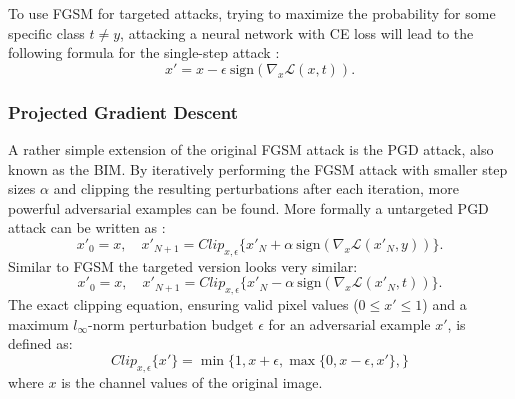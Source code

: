 To use \ac{FGSM} for targeted attacks, trying to maximize the probability for some specific class $t \ne y$, attacking a neural network with \ac{CE} loss will lead to the following formula for the single-step attack \cite{kurakin2016scale}:
\begin{equation}
x' = x - \epsilon\ \text{sign}(\nabla_x\mathcal{L}(x, t)).
\label{eq:fgsm-targeted}
\end{equation}

\subsubsection{Projected Gradient Descent}
A rather simple extension of the original \ac{FGSM} attack is the \ac{PGD} attack, also known as the \ac{BIM}. By iteratively performing the \ac{FGSM} attack with smaller step sizes $\alpha$ and clipping the resulting perturbations after each iteration, more powerful adversarial examples can be found. More formally a untargeted \ac{PGD} attack can be written as \parencite{kurakin2016adversarial}:
\begin{equation}
x'_0 = x,\quad x'_{N+1} = Clip_{x,\epsilon}\Big\{ x'_N + \alpha\ \text{sign}(\nabla_x\mathcal{L}(x'_N, y)) \Big\}.
\label{eq:pgd-untargeted}
\end{equation}
Similar to \ac{FGSM} the targeted version looks very similar:
\begin{equation}
x'_0 = x,\quad x'_{N+1} = Clip_{x,\epsilon}\Big\{ x'_N - \alpha\ \text{sign}(\nabla_x\mathcal{L}(x'_N, t)) \Big\}.
\label{eq:pgd-targeted}
\end{equation}
The exact clipping equation, ensuring valid pixel values ($0\le x' \le 1$) and a maximum $l_\infty$-norm perturbation budget $\epsilon$ for an adversarial example $x'$, is defined as:
\begin{equation}
Clip_{x,\epsilon} \big\{ x' \big\} = \min \Big\{1, x +\epsilon,\max \big\{ 0,x-\epsilon, x'\big\}, \Big\}
\label{eq:clip}
\end{equation}
where $x$ is the channel values of the original image.

